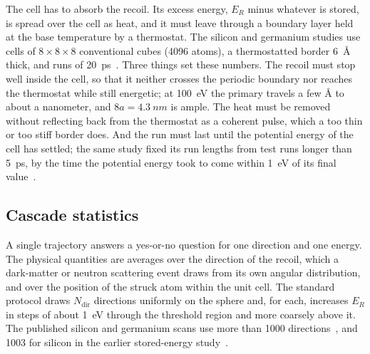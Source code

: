 The cell has to absorb the recoil. Its excess energy, $E_R$ minus whatever is stored, is spread over the cell as heat, and it must leave through a boundary layer held at the base temperature by a thermostat. The silicon and germanium studies use cells of $8\times8\times8$ conventional cubes (4096 atoms), a thermostatted border \SI{6}{\angstrom} thick, and runs of \SI{20}{ps}~\cite[Sect.~II\,A and Table~I]{sassi2022energy}. Three things set these numbers. The recoil must stop well inside the cell, so that it neither crosses the periodic boundary nor reaches the thermostat while still energetic; at \SI{100}{eV} the primary travels a few \si{\angstrom} to about a nanometer, and $8a = \SI{4.3}{nm}$ is ample. The heat must be removed without reflecting back from the thermostat as a coherent pulse, which a too thin or too stiff border does. And the run must last until the potential energy of the cell has settled; the same study fixed its run lengths from test runs longer than \SI{5}{ps}, by the time the potential energy took to come within \SI{1}{eV} of its final value~\cite[Sect.~II\,A]{sassi2022energy}.

\subsection{Cascade statistics}

A single trajectory answers a yes-or-no question for one direction and one energy. The physical quantities are averages over the direction of the recoil, which a dark-matter or neutron scattering event draws from its own angular distribution, and over the position of the struck atom within the unit cell. The standard protocol draws $N_{\mathrm{dir}}$ directions uniformly on the sphere and, for each, increases $E_R$ in steps of about \SI{1}{eV} through the threshold region and more coarsely above it. The published silicon and germanium scans use more than 1000 directions~\cite[Sect.~II\,A]{sassi2022energy}, and 1003 for silicon in the earlier stored-energy study~\cite{kadribasic2020crystal}.

